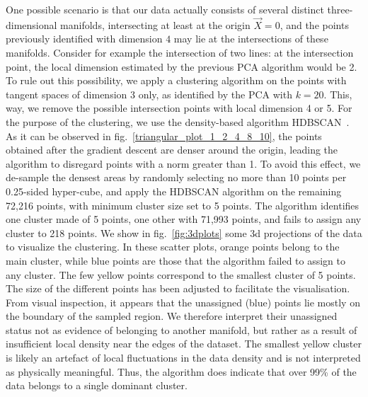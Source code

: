 \documentclass[11pt,a4paper]{article}
\begin{document}
	One possible scenario is that our data actually consists of several distinct three-dimensional manifolds, intersecting at least at the origin $\vec{X}=0$, and the points previously identified with dimension $4$ may lie at the intersections of these manifolds. Consider for example the intersection of two lines: at the intersection point, the local dimension estimated by the previous PCA algorithm would be 2. To rule out this possibility, we apply a clustering algorithm on the points with tangent spaces of dimension 3 only, as identified by the PCA with $k=20$. This, way, we remove the possible intersection points with local dimension 4 or 5. For the purpose of the clustering, we use the density-based algorithm HDBSCAN~\cite{10.1007/978-3-642-37456-2_14}. %
	As it can be observed in fig.~\ref{triangular_plot_1_2_4_8_10}, the points obtained after the gradient descent are denser around the origin, leading the algorithm to disregard points with a norm greater than 1. To avoid this effect, we de-sample the densest areas by randomly selecting no more than 10 points per 0.25-sided hyper-cube, and apply the HDBSCAN algorithm on the remaining 72,216 points, with minimum cluster size set to 5 points. The algorithm identifies one cluster made of 5 points, one other with 71,993 points, and fails to assign any cluster to 218 points. We show in fig.~\ref{fig:3dplots} some 3d projections of the data to visualize the clustering. In these scatter plots, orange points belong to the main cluster, while blue points are those that the algorithm failed to assign to any cluster. The few yellow points correspond to the smallest cluster of 5 points. The size of the different points has been adjusted to facilitate the visualisation. From visual inspection, it appears that the unassigned (blue) points lie mostly on the boundary of the sampled region. We therefore interpret their unassigned status not as evidence of belonging to another manifold, but rather as a result of insufficient local density near the edges of the dataset. The smallest yellow cluster is likely an artefact of local fluctuations in the data density and is not interpreted as physically meaningful. Thus, the algorithm does indicate that over 99\% of the data belongs to a single dominant cluster.
\end{document}
